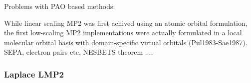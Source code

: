 Problems with PAO based methods: %

While linear scaling MP2 was first achived using an atomic orbital formulation, the first low-scaling MP2 implementations were actually formulated in a local molecular orbital basis with domain-specific virtual orbitals (Pul1983-Sae1987). SEPA, electron pairs etc, NESBETS theorem ....


\subsubsection{Laplace LMP2}

